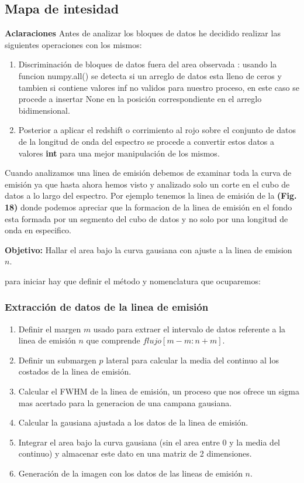 \documentclass[9pt,twocolumn,a4paper]{opticajnl}
\begin{document}
\subsection*{Mapa de intesidad}

\textbf{Aclaraciones}
Antes de analizar los bloques de datos he decidido realizar las siguientes operaciones con los mismos:

\begin{enumerate}
  \item Discriminación de bloques de datos fuera del area observada : usando la funcion numpy.all() se detecta si un arreglo de datos esta lleno de ceros y tambien si contiene valores inf no validos para nuestro proceso, en este caso se procede a insertar None en la posición correspondiente en el arreglo bidimensional. \item Posterior a aplicar el redshift o corrimiento al rojo sobre el conjunto de datos de la longitud de onda del espectro se procede a convertir estos datos a valores \textbf{int} para una mejor manipulación de los mismos. 
\end{enumerate}



Cuando analizamos una linea de emisión debemos de examinar toda la curva de emisión ya que hasta ahora hemos visto y analizado solo un corte en el cubo de datos a lo largo del espectro. Por ejemplo tenemos la linea de emisión de la \textbf{(Fig. 18)} donde podemos apreciar que la formacion de la linea de emisión en el fondo esta formada por un segmento del cubo de datos y no solo por una longitud de onda en especifico.

\textbf{Objetivo: } Hallar el area bajo la curva gausiana con ajuste a la linea de emision $n$. 

para iniciar hay que definir el método y nomenclatura que ocuparemos:
\subsubsection*{Extracción de datos de la linea de emisión}
\begin{enumerate}
  \item Definir el margen $m$ usado para extraer el intervalo de datos referente a la linea de emisión $n$ que comprende $flujo[m-m:n+m]$.
  \item Definir un submargen $p$ lateral para calcular la media del continuo al los costados de la linea de emisión.
  \item Calcular el FWHM de la linea de emisión, un proceso que nos ofrece un sigma mas acertado para la generacion de una campana gausiana.
  \item Calcular la gausiana ajustada a los datos de la linea de emisión.
  \item Integrar el area bajo la curva gausiana (sin el area entre 0 y la media del continuo) y almacenar este dato en una matriz de 2 dimensiones.
  \item Generación de la imagen con los datos de las lineas de emisión $n$.
\end{enumerate}
\end{document}
